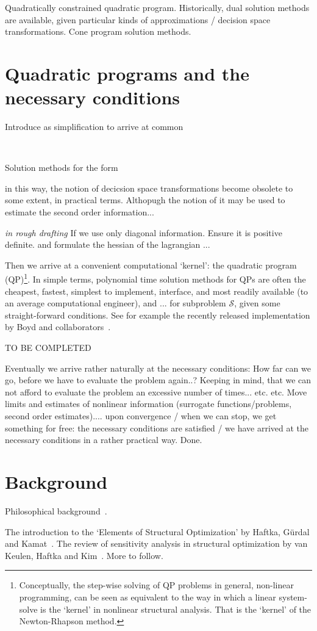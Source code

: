 \documentclass[11pt]{article}
\begin{document}
Quadratically constrained quadratic program. Historically, dual solution methods are available, given particular kinds of approximations / decision space transformations. Cone program solution methods.

\section{Quadratic programs and the necessary conditions}

Introduce as simplification to arrive at common 

~\cite{osqp}


Solution methods for the form

in this way, the notion of decicsion space transformations become obsolete to some extent, in practical terms. Althopugh the notion of it may be used to estimate the second order information... 

\emph{in rough drafting}
If we use only diagonal information. Ensure it is positive definite. and formulate the hessian of the lagrangian ... 

Then we arrive at a convenient computational `kernel': the quadratic program (QP)\footnote{Conceptually, the step-wise solving of QP problems in general, non-linear programming, can be seen as equivalent to the way in which a linear system-solve is the `kernel' in nonlinear structural analysis. That is the `kernel' of the Newton-Rhapson method.}. In simple terms, polynomial time solution methods for QPs are often the cheapest, fastest, simplest to implement, interface, and most readily available (to an average computational engineer), and ... for subproblem $\mathcal{S}$, given some straight-forward conditions. See for example the recently released implementation by Boyd and collaborators~\cite{osqp}.  

TO BE COMPLETED

Eventually we arrive rather naturally at the necessary conditions: How far can we go, before we have to evaluate the problem again..? Keeping in mind, that we can not afford to evaluate the problem an excessive number of times... etc. etc. Move limits and estimates of nonlinear information (surrogate functions/problems, second order estimates).... upon convergence / when we can stop, we get something for free: the necessary conditions are satisfied / we have arrived at the necessary conditions in a rather practical way. Done.


\section*{Background}
Philosophical background~\cite{deutsch2011fabric}.

The introduction to the `Elements of Structural Optimization' by Haftka, G\"urdal and Kamat~\cite{haftka1990}. The review of sensitivity analysis in structural optimization by van Keulen, Haftka and Kim~\cite{keulen2005}. More to follow. 

 
 
\end{document}
